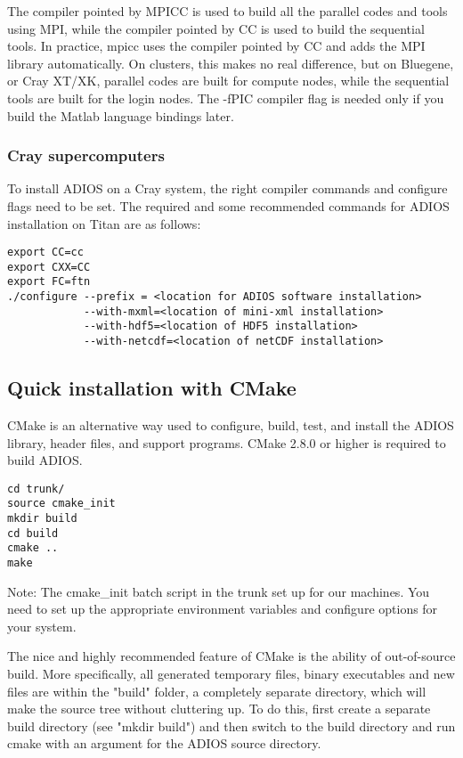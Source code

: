 The compiler pointed by MPICC is used to build all the parallel codes and tools 
using MPI, while the compiler pointed by CC is used to build the sequential tools. 
In practice, mpicc uses the compiler pointed by CC and adds the MPI library automatically. 
On clusters, this makes no real difference, but on Bluegene, or Cray XT/XK, parallel 
codes are built for compute nodes, while the sequential tools are built for the 
login nodes. The -fPIC compiler flag is needed only if you build the 
Matlab language bindings later.


\subsubsection{Cray supercomputers}

To install ADIOS on a Cray system, the right compiler commands and configure flags 
need to be set. The required and some recommended commands for ADIOS installation on 
Titan are as follows:

\begin{lstlisting}
export CC=cc
export CXX=CC
export FC=ftn
./configure --prefix = <location for ADIOS software installation>
            --with-mxml=<location of mini-xml installation>
            --with-hdf5=<location of HDF5 installation>
            --with-netcdf=<location of netCDF installation>
\end{lstlisting}

\subsection{Quick installation with CMake}

CMake is an alternative way used to configure, build, test, and install the ADIOS library, 
header files, and support programs. CMake 2.8.0 or higher is required to build ADIOS.

\begin{lstlisting}
cd trunk/
source cmake_init
mkdir build
cd build
cmake .. 
make
\end{lstlisting}

Note: The cmake\_init batch script in the trunk set up for our machines. You need to
set up the appropriate environment variables and configure options for your system.

The nice and highly recommended feature of CMake is the ability of out-of-source build. 
More specifically, all generated temporary files, binary executables and new files are within
the "build" folder, a completely separate directory, which will make the source tree without cluttering up. To do this,
first create a separate build directory (see "mkdir build")
and then switch to the build directory and run cmake with an argument for the ADIOS source directory.

